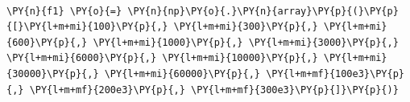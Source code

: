     \begin{center}
    \end{center}
    { \hspace*{\fill} \\}
    
    \begin{tcolorbox}[breakable, size=fbox, boxrule=1pt, pad at break*=1mm,colback=cellbackground, colframe=cellborder]
\begin{Verbatim}[commandchars=\\\{\}]
\PY{n}{f1} \PY{o}{=} \PY{n}{np}\PY{o}{.}\PY{n}{array}\PY{p}{(}\PY{p}{[}\PY{l+m+mi}{100}\PY{p}{,} \PY{l+m+mi}{300}\PY{p}{,} \PY{l+m+mi}{600}\PY{p}{,} \PY{l+m+mi}{1000}\PY{p}{,} \PY{l+m+mi}{3000}\PY{p}{,} \PY{l+m+mi}{6000}\PY{p}{,} \PY{l+m+mi}{10000}\PY{p}{,} \PY{l+m+mi}{30000}\PY{p}{,} \PY{l+m+mi}{60000}\PY{p}{,} \PY{l+m+mf}{100e3}\PY{p}{,} \PY{l+m+mf}{200e3}\PY{p}{,} \PY{l+m+mf}{300e3}\PY{p}{]}\PY{p}{)}
\end{Verbatim}
\end{tcolorbox}

